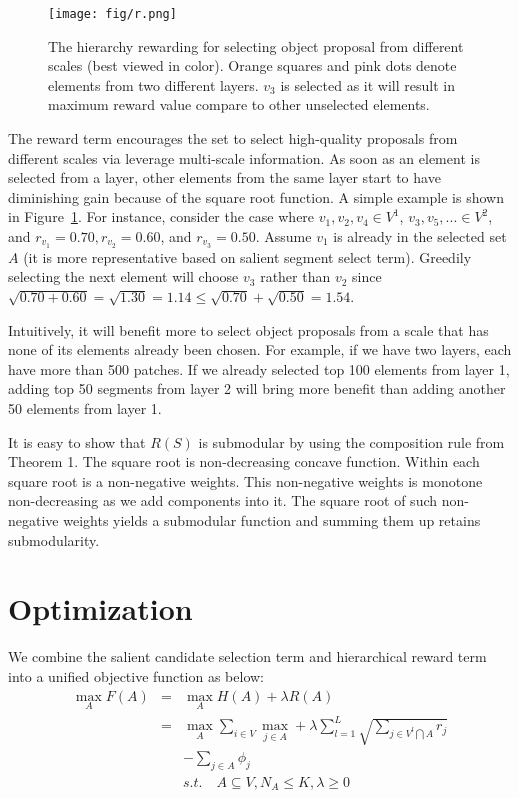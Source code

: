 \documentclass[10pt,twocolumn,letterpaper]{article}
\begin{document}
\begin{figure}
\begin{center}
   \texttt{[image: fig/r.png]}
\end{center}
   \caption{The hierarchy rewarding for selecting object proposal from different scales (best viewed in color). Orange squares and pink dots denote elements from two different layers. $v_3$ is selected as it will result in maximum reward value compare to other unselected elements.}
\label{fig:reward}
\end{figure}

The reward term encourages the set to select high-quality proposals from different scales via leverage multi-scale information. As soon as an element is selected from a layer, other elements from the same layer start to have diminishing gain because of the square root function. A simple example is shown in Figure~\ref{fig:reward}. For instance, consider the case where $v_1,v_2,v_4\in V^1$, $v_3, v_5, ... \in V^2$, and $r_{v_1}=0.70, r_{v_2}=0.60$, and $r_{v_3}=0.50$. Assume $v_1$ is already in the selected set $A$  (it is more representative based on salient segment select term). Greedily selecting the next element will choose $v_3$ rather than $v_2$ since $\sqrt{0.70+0.60}=\sqrt{1.30}=1.14 \leq \sqrt{0.70}+\sqrt{0.50}=1.54$. 

Intuitively, it will benefit more to select object proposals from a scale that has none of its elements already been chosen. For example, if we have two layers, each have more than 500 patches. If we already selected top 100 elements from layer 1, adding top 50 segments from layer 2 will bring more benefit than adding another 50 elements from layer 1.

It is easy to show that $R(S)$ is submodular by using the composition rule from Theorem 1. The square root is non-decreasing concave function. Within each square root is a non-negative weights. This non-negative weights is monotone non-decreasing as we add components into it. The square root of such non-negative weights yields a submodular function and summing them up retains submodularity.

\section{Optimization}
We combine the salient candidate selection term and hierarchical reward term into a unified objective function as below:
\begin{eqnarray}
\label{eqn:obj}
\max_A F(A)&=&\max_{A}H(A)+\lambda R(A)\\
&=& \max_{A}\sum_{i\in V}\max_{j \in A} + \lambda \sum_{l=1}^L\sqrt{\sum_{j\in V^l \bigcap A}r_j} \nonumber \\
&&-\sum_{j\in A}\phi_j \nonumber \\
&&s.t. \quad A \subseteq V, N_A\leq K, \lambda \geq 0 \nonumber
\end{eqnarray}
\end{document}

